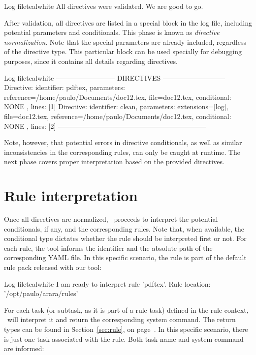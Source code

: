 \begin{codebox}{Log file}{teal}{\icnote}{white}
All directives were validated. We are good to go.
\end{codebox}

After validation, all directives are listed in a special block in the log file, including potential parameters and conditionals. This phase is known as \emph{directive normalization}. Note that the special parameters are already included, regardless of the directive type.  This particular block can be used specially for debugging purposes, since it contains all details regarding directives.

\begin{codebox}{Log file}{teal}{\icnote}{white}
-------------------------- DIRECTIVES ---------------------------
Directive: { identifier: pdftex, parameters:
{reference=/home/paulo/Documents/doc12.tex,
file=doc12.tex}, conditional: { NONE }, lines: [1] }
Directive: { identifier: clean, parameters: {extensions=[log],
file=doc12.tex, reference=/home/paulo/Documents/doc12.tex},
conditional: { NONE }, lines: [2] }
-----------------------------------------------------------------
\end{codebox}

Note, however, that potential errors in directive conditionals, as well as similar inconsistencies in the corresponding rules, can only be caught at runtime. The next phase covers proper interpretation based on the provided directives.

\section{Rule interpretation}
\label{sec:ruleinterpretation}

Once all directives are normalized, \arara\ proceeds to interpret the potential conditionals, if any, and the corresponding rules. Note that, when available, the conditional type dictates whether the rule should be interpreted first or not. For each rule, the tool informs the identifier and the absolute path of the corresponding YAML file. In this specific scenario, the rule is part of the default rule pack released with our tool:

\begin{codebox}{Log file}{teal}{\icnote}{white}
I am ready to interpret rule 'pdftex'.
Rule location: '/opt/paulo/arara/rules'
\end{codebox}

For each task (or subtask, as it is part of a rule task) defined in the rule context, \arara\ will interpret it and return the corresponding system command. The return types can be found in Section~\ref{sec:rule}, on page~\pageref{sec:rule}. In this specific scenario, there is just one task associated with the  rule. Both task name and system command are informed:

